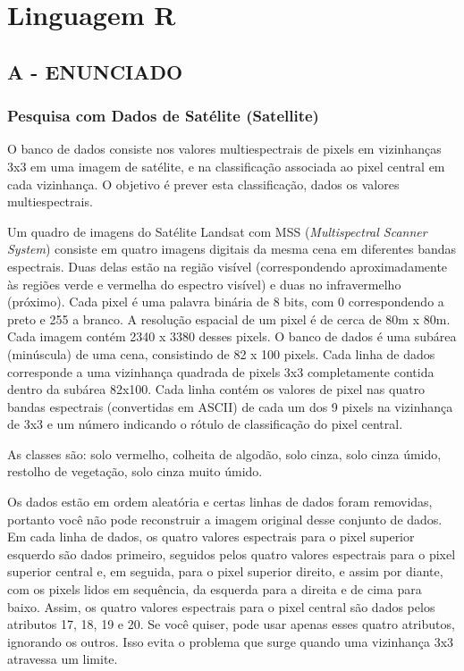 \label{ap:ap03}
\chapter{Linguagem R}
\section*{\textbf{A - ENUNCIADO}}
\subsection{Pesquisa com Dados de Satélite (Satellite)}



O banco de dados consiste nos valores multiespectrais de pixels em vizinhanças 3x3 em uma imagem de satélite, e na
classificação associada ao pixel central em cada vizinhança. O objetivo é prever esta classificação, dados os valores
multiespectrais.

Um quadro de imagens do Satélite Landsat com MSS (\textit{Multispectral Scanner System}) consiste em quatro imagens
digitais da mesma cena em diferentes bandas espectrais. Duas delas estão na região visível (correspondendo
aproximadamente às regiões verde e vermelha do espectro visível) e duas no infravermelho (próximo). Cada pixel é uma
palavra binária de 8 bits, com 0 correspondendo a preto e 255 a branco. A resolução espacial de um pixel é de cerca de
80m x 80m. Cada imagem contém 2340 x 3380 desses pixels. O banco de dados é uma subárea (minúscula) de uma cena,
consistindo de 82 x 100 pixels. Cada linha de dados corresponde a uma vizinhança quadrada de pixels 3x3 completamente
contida dentro da subárea 82x100. Cada linha contém os valores de pixel nas quatro bandas espectrais (convertidas em
ASCII) de cada um dos 9 pixels na vizinhança de 3x3 e um número indicando o rótulo de classificação do pixel central.

As classes são: solo vermelho, colheita de algodão, solo cinza, solo cinza úmido, restolho de vegetação, solo cinza
muito úmido.

Os dados estão em ordem aleatória e certas linhas de dados foram removidas, portanto você não pode reconstruir a imagem
original desse conjunto de dados. Em cada linha de dados, os quatro valores espectrais para o pixel superior esquerdo
são dados primeiro, seguidos pelos quatro valores espectrais para o pixel superior central e, em seguida, para o pixel
superior direito, e assim por diante, com os pixels lidos em sequência, da esquerda para a direita e de cima para
baixo. Assim, os quatro valores espectrais para o pixel central são dados pelos atributos 17, 18, 19 e 20. Se você
quiser, pode usar apenas esses quatro atributos, ignorando os outros. Isso evita o problema que surge quando uma
vizinhança 3x3 atravessa um limite.

